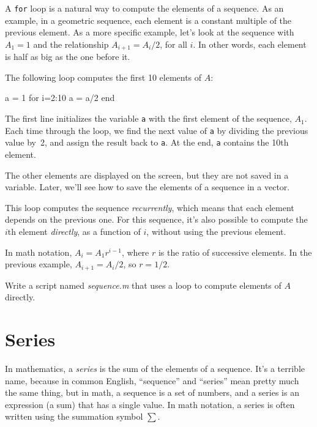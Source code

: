A \lstinline{for} loop is a natural way to compute the elements of a sequence.
As an example, in a geometric sequence, each element is a constant
multiple of the previous element.  As a more specific example, let's
look at the sequence with $A_1 = 1$ and the relationship $A_{i+1} = A_i/2$,
for all $i$.  In other words, each element is half as big as the one before it.

The following loop computes the first 10 elements of $A$:

\begin{code}
a = 1
for i=2:10
    a = a/2
end
\end{code}

The first line initializes the variable \lstinline{a} with the first element of the sequence, $A_1$.
Each time through the loop, we find the next value of \lstinline{a}
by dividing the previous value by~2, and assign the result back to \lstinline{a}.
At the end, \lstinline{a} contains the 10th element.

The other elements are displayed on the screen, but they are not saved in a variable.
Later, we'll see how to save the elements of a sequence in a vector.


This loop computes the sequence \emph{recurrently}, which means
that each element depends on the previous one.
For this sequence, it's also possible to compute the $i$th element
\emph{directly}, as a function of $i$, without using the previous element.

In math notation, $A_i = A_1 r^{i-1}$, where $r$ is the ratio of successive elements.
In the previous example, $A_{i+1} = A_i/2$, so $r = 1/2$.

\begin{ex}
Write a script named \emph{sequence.m} that uses a loop to
compute elements of $A$ \mbox{directly}.
\end{ex}


\section{Series}
\label{series}

In mathematics, a \emph{series} is the sum of the elements of
a sequence.  It's a terrible name, because in common English,
``sequence'' and ``series'' mean pretty much the same thing, but in
math, a sequence is a set of numbers, and a series is an expression
(a sum) that has a single value.  In math notation,  a series
is often written using the summation symbol $\sum$.


